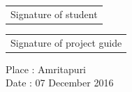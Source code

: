 \vspace{20pt}
\begin{flushleft}
 


\begin{tabular}[t]{@{}l} 
  {{Signature of student}}\\ 
\end{tabular}
\hfill%
\begin{tabular}[t]{l@{}}
   {{Signature of project guide}}\\
\end{tabular}
\end{flushleft}


\vspace{5pt}
\begin{flushleft}
 


Place    :    Amritapuri \\

Date    :    07 December 2016

\end{flushleft}
